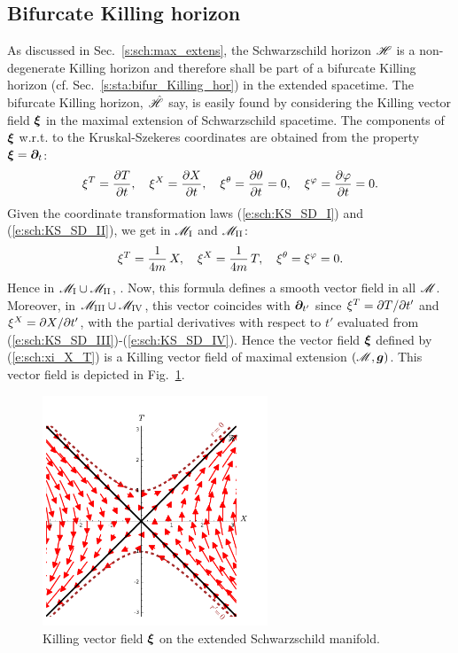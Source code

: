 \subsection{Bifurcate Killing horizon}

As discussed in Sec.~\ref{s:sch:max_extens}, the Schwarzschild horizon
$\mathscr{H}$ is
a non-degenerate Killing horizon and therefore shall be part of
a bifurcate Killing horizon (cf. Sec.~\ref{s:sta:bifur_Killing_hor})
in the extended spacetime.
The bifurcate Killing horizon, $\hat{\mathscr{H}}$ say, is easily found by
considering the Killing vector field $\bm{\xi}$ in the maximal extension
of Schwarzschild spacetime. The components of $\bm{\xi}$ w.r.t. to the
Kruskal-Szekeres coordinates are obtained from the
property $\bm{\xi} = \bm{\partial}_t$:
\[
    \xi^T = \frac{\partial T}{\partial t}, \quad
    \xi^X = \frac{\partial X}{\partial t}, \quad
    \xi^\theta = \frac{\partial \theta}{\partial t} = 0, \quad
    \xi^\varphi = \frac{\partial \varphi}{\partial t} = 0 .
\]
Given the coordinate transformation laws (\ref{e:sch:KS_SD_I})
and (\ref{e:sch:KS_SD_II}), we get in
$\mathscr{M}_{\rm I}$ and $\mathscr{M}_{\rm II}$:
\[
    \xi^T = \frac{1}{4m} \, X, \quad
    \xi^X = \frac{1}{4m} \, T , \quad
    \xi^\theta = \xi^\varphi = 0 .
\]
Hence in $\mathscr{M}_{\rm I}\cup\mathscr{M}_{\rm II}$,
\be \label{e:sch:xi_X_T}
    .
\ee
Now, this formula defines a smooth vector field in all $\mathscr{M}$.
Moreover, in $\mathscr{M}_{\rm III}\cup\mathscr{M}_{\rm IV}$, this vector coincides with
$\bm{\partial}_{t'}$ since $\xi^T = {\partial T}/{\partial t'}$ and $\xi^X = {\partial X}/{\partial t'}$,
with the partial derivatives with respect to $t'$ evaluated from
(\ref{e:sch:KS_SD_III})-(\ref{e:sch:KS_SD_IV}). Hence the vector field
$\bm{\xi}$ defined by (\ref{e:sch:xi_X_T}) is a Killing vector field
of maximal extension $(\mathscr{M},\bm{g})$. This vector field is depicted in
Fig.~\ref{f:sch:xi_extend}.

\begin{figure}
\centerline{\includegraphics[width=0.6\textwidth]{sch_xi_extend.pdf}}
\caption[]{\label{f:sch:xi_extend} \footnotesize
Killing vector field $\bm{\xi}$ on the extended Schwarzschild manifold.}
\end{figure}

